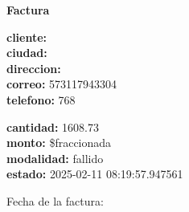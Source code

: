\documentclass{article}
\begin{document}
\begin{center}
    {\LARGE \textbf{Factura}}\\[1cm]
\end{center}

\textbf{cliente:}  \\
\textbf{ciudad:}  \\
\textbf{direccion:}  \\
\textbf{correo:} 573117943304 \\
\textbf{telefono:} 768 \\

\vspace{0.5cm}

\textbf{cantidad:} 1608.73 \\
\textbf{monto:} \$fraccionada \\
\textbf{modalidad:} fallido \\
\textbf{estado:} 2025-02-11 08:19:57.947561 \\

\vspace{1cm}

Fecha de la factura: 
\end{document}
